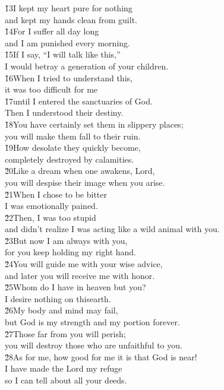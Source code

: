 \begin{poetry}
\poeml \v{13}I kept my heart pure for nothing \\
\poemll    and kept my hands clean from guilt. \\
\poeml \v{14}For I suffer all day long \\
\poemll    and I am punished every morning. \\
\poeml \v{15}If I say, ``I will talk like this,'' \\
\poemll    I would betray a generation of your children. \\
\poeml \v{16}When I tried to understand this, \\
\poemll    it was too difficult for me \\
\poeml \v{17}until I entered the sanctuaries of God. \\
\poemll    Then I understood their destiny. \\
\poeml \v{18}You have certainly set them in slippery places; \\
\poemll    you will make them fall to their ruin. \\
\poeml \v{19}How desolate they quickly become, \\
\poemll    completely destroyed by calamities. \\
\poeml \v{20}Like a dream when one awakens, Lord, \\
\poemll    you will despise their image when you arise. \\
\poeml \v{21}When I chose to be bitter \\
\poemll    I was emotionally pained. \\
\poeml \v{22}Then, I was too stupid \\
\poemll    and didn't realize I was acting like a wild animal with you. \\
\poeml \v{23}But now I am always with you, \\
\poemll    for you keep holding my right hand. \\
\poeml \v{24}You will guide me with your wise advice, \\
\poemll    and later you will receive me with honor. \\
\poeml \v{25}Whom do I have in heaven but you? \\
\poemll    I desire nothing on thisearth. \\
\poeml \v{26}My body and mind may fail, \\
\poemll    but God is my strength and my portion forever. \\
\poeml \v{27}Those far from you will perish; \\
\poemll    you will destroy those who are unfaithful to you. \\
\poeml \v{28}As for me, how good for me it is that God is near! \\
\poemll    I have made the Lord  my refuge \\
\poemlll       so I can tell about all your deeds.
\end{poetry}
